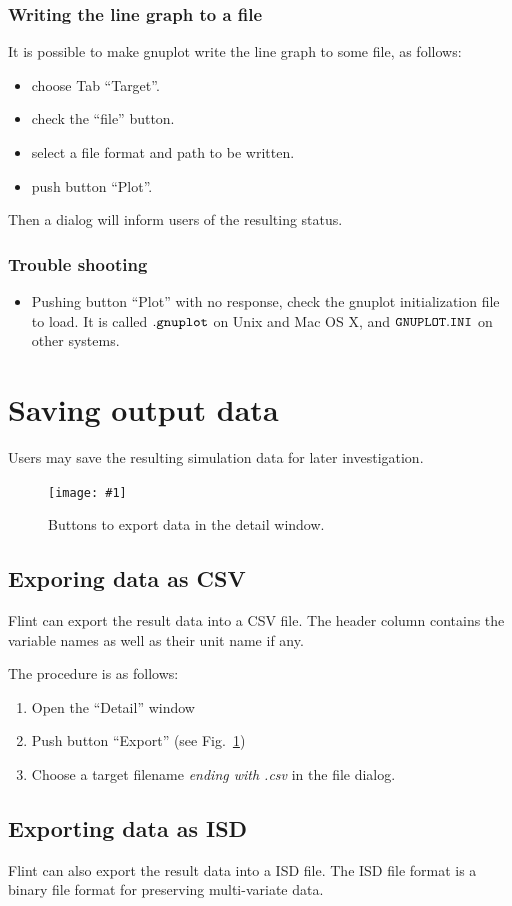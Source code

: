 \documentclass[a4paper,10pt]{report}
\newcommand\FigureOfImage[2]{\begin{figure}[h]
  \centering
  \texttt{[image: \#1]}
  \caption{#2}\label{fig:#1}
\end{figure}}
\begin{document}
\subsubsection{Writing the line graph to a file}
It is possible to make gnuplot write the line graph to some file, as follows:
\begin{itemize}
\item choose Tab ``Target''.
\item check the ``file'' button.
\item select a file format and path to be written.
\item push button ``Plot''.
\end{itemize}
Then a dialog will inform users of the resulting status.

\subsubsection{Trouble shooting}
\begin{itemize}
\item Pushing button ``Plot'' with no response, check the gnuplot initialization
  file to load. It is called $\tt{.gnuplot}$ on Unix and Mac OS X, and
  $\tt{GNUPLOT.INI}$ on other systems.
\end{itemize}

\section{Saving output data}
Users may save the resulting simulation data for later investigation.
\FigureOfImage{lr-detail-buttons}{Buttons to export data in the detail window.}

\subsection{Exporing data as CSV}
Flint can export the result data into a CSV file.
The header column contains the variable names as well as their unit name if any.

The procedure is as follows:
\begin{enumerate}
\item Open the ``Detail'' window
\item Push button ``Export'' (see Fig.~\ref{fig:lr-detail-buttons})
\item Choose a target filename \emph{ending with .csv} in the file dialog.
\end{enumerate}

\subsection{Exporting data as ISD}
Flint can also export the result data into a ISD file.
The ISD file format is a binary file format for preserving multi-variate data.
\end{document}
